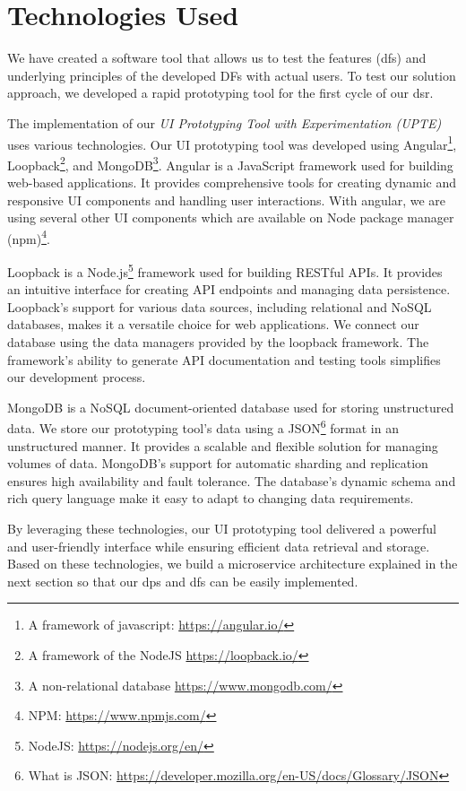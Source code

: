 \clearpage
\section{Technologies Used}
\label{implementation:section:technologies}
We have created a software tool that allows us to test the features (\ac{df}s) and underlying principles of the developed DFs with actual users.
To test our solution approach, we developed a rapid prototyping tool for the first cycle of our \ac{dsr}. 

The implementation of our \textit{UI Prototyping Tool with Experimentation (UPTE)} uses various technologies.
Our UI prototyping tool was developed using Angular\footnote{A framework of javascript: \url{https://angular.io/}}, Loopback\footnote{A framework of the NodeJS \url{https://loopback.io/}}, and MongoDB\footnote{A non-relational database \url{https://www.mongodb.com/}}.
Angular is a JavaScript framework used for building web-based applications.
It provides comprehensive tools for creating dynamic and responsive UI components and handling user interactions.
With angular, we are using several other UI components which are available on Node package manager (npm)\footnote{NPM: \url{https://www.npmjs.com/}}.

Loopback is a Node.js\footnote{NodeJS: \url{https://nodejs.org/en/}} framework used for building RESTful APIs. 
It provides an intuitive interface for creating API endpoints and managing data persistence. 
Loopback's support for various data sources, including relational and NoSQL databases, makes it a versatile choice for web applications. 
We connect our database using the data managers provided by the loopback framework.
The framework's ability to generate API documentation and testing tools simplifies our development process.

MongoDB is a NoSQL document-oriented database used for storing unstructured data. 
We store our prototyping tool's data using a JSON\footnote{What is JSON: \url{https://developer.mozilla.org/en-US/docs/Glossary/JSON}} format in an unstructured manner.
It provides a scalable and flexible solution for managing volumes of data. 
MongoDB's support for automatic sharding and replication ensures high availability and fault tolerance. 
The database's dynamic schema and rich query language make it easy to adapt to changing data requirements.

By leveraging these technologies, our UI prototyping tool delivered a powerful and user-friendly interface while ensuring efficient data retrieval and storage.
Based on these technologies, we build a microservice architecture explained in the next section so that our \ac{dp}s and \ac{df}s can be easily implemented. 
\clearpage

